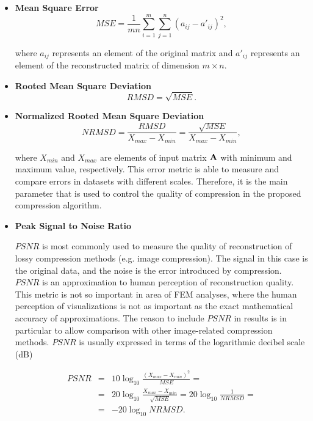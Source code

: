 \begin{itemize}

\item \textbf{Mean Square Error}
\begin{equation}
\mathit{MSE}=\frac{1}{m n} \sum_{i=1}^{m} \sum_{j=1}^{n} (a_{ij} - a'_{ij})^{2},
\label{eq:mse-def}
\end{equation}

\noindent
where $a_{ij}$ represents an element of the original matrix and $a'_{ij}$ represents an element of the
reconstructed matrix of dimension $m \times n$.

\item \textbf{Rooted Mean Square Deviation}
\begin{equation}
\mathit{RMSD} = \sqrt{\mathit{MSE}}.
\label{eq:rmsd-def}
\end{equation}

\item \textbf{Normalized Rooted Mean Square Deviation}
\begin{equation}
\mathit{NRMSD} = \frac{\mathit{RMSD}}{X_{max}-X_{min}}=\frac{\sqrt{\mathit{MSE}}}{X_{max}-X_{min}},
\label{eq:nrmsd-def}
\end{equation}

\noindent
where $X_{min}$ and $X_{max}$ are elements of input matrix $\mathbf{A}$ with minimum and maximum value, respectively. This error metric is able to measure and compare errors in datasets with different scales. Therefore, it is the main parameter that is used to control the quality of compression in the proposed compression algorithm.

\item \textbf{Peak Signal to Noise Ratio}

$\mathit{PSNR}$ is most commonly used to measure the quality of reconstruction of lossy compression methods (e.g. image compression). The signal in this case is the original data, and the noise is the error introduced by compression. $\mathit{PSNR}$ is an approximation to human perception of reconstruction quality. This metric is not so important in area of FEM analyses, where the human perception of visualizations is not as important as the exact mathematical accuracy of approximations. The reason to include $\mathit{PSNR}$ in results is in particular to allow comparison with other image-related compression methods. $\mathit{PSNR}$ is usually expressed in terms of the logarithmic decibel scale (dB)

\begin{eqnarray}
\mathit{PSNR} &=& 10\log_{10}\frac{(X_{max}-X_{min})^{2}}{\mathit{MSE}} =
\\
&=& 20\log_{10}\frac{X_{max}-X_{min}}{\sqrt{\mathit{MSE}}}=20\log_{10}\frac{1}{\mathit{NRMSD}} = \nonumber
\\
&=& -20\log_{10}\mathit{NRMSD}. \nonumber
\label{eq:psnr-def}
\end{eqnarray}


\end{itemize}
